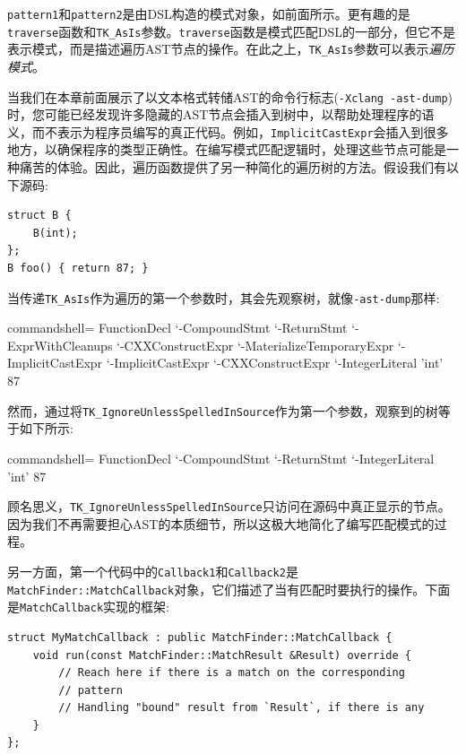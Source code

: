 \texttt{pattern1}和\texttt{pattern2}是由DSL构造的模式对象，如前面所示。更有趣的是\texttt{traverse}函数和\texttt{TK\_AsIs}参数。\texttt{traverse}函数是模式匹配DSL的一部分，但它不是表示模式，而是描述遍历AST节点的操作。在此之上，\texttt{TK\_AsIs}参数可以表示\textit{遍历模式}。

当我们在本章前面展示了以文本格式转储AST的命令行标志(\texttt{-Xclang -ast-dump})时，您可能已经发现许多隐藏的AST节点会插入到树中，以帮助处理程序的语义，而不表示为程序员编写的真正代码。例如，\texttt{ImplicitCastExpr}会插入到很多地方，以确保程序的类型正确性。在编写模式匹配逻辑时，处理这些节点可能是一种痛苦的体验。因此，遍历函数提供了另一种简化的遍历树的方法。假设我们有以下源码:

\begin{lstlisting}[style=styleCXX]
struct B {
	B(int);
};
B foo() { return 87; }
\end{lstlisting}

当传递\texttt{TK\_AsIs}作为遍历的第一个参数时，其会先观察树，就像\texttt{-ast-dump}那样:

\begin{tcblisting}{commandshell={}}
FunctionDecl
`-CompoundStmt
  `-ReturnStmt
    `-ExprWithCleanups
      `-CXXConstructExpr
        `-MaterializeTemporaryExpr
          `-ImplicitCastExpr
            `-ImplicitCastExpr
              `-CXXConstructExpr
                `-IntegerLiteral 'int' 87
\end{tcblisting}

然而，通过将\texttt{TK\_IgnoreUnlessSpelledInSource}作为第一个参数，观察到的树等于如下所示:

\begin{tcblisting}{commandshell={}}
FunctionDecl
`-CompoundStmt
  `-ReturnStmt
    `-IntegerLiteral 'int' 87
\end{tcblisting}

顾名思义，\texttt{TK\_IgnoreUnlessSpelledInSource}只访问在源码中真正显示的节点。因为我们不再需要担心AST的本质细节，所以这极大地简化了编写匹配模式的过程。

另一方面，第一个代码中的\texttt{Callback1}和\texttt{Callback2}是\texttt{MatchFinder::MatchCallback}对象，它们描述了当有匹配时要执行的操作。下面是\texttt{MatchCallback}实现的框架:

\begin{lstlisting}[style=styleCXX]
struct MyMatchCallback : public MatchFinder::MatchCallback {
	void run(const MatchFinder::MatchResult &Result) override {
		// Reach here if there is a match on the corresponding
		// pattern
		// Handling "bound" result from `Result`, if there is any
	}
};
\end{lstlisting}

